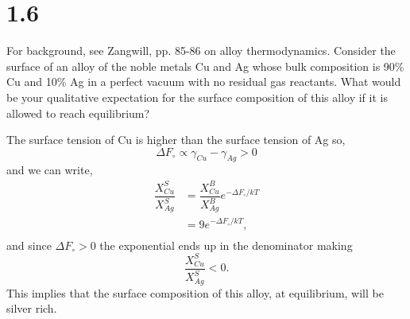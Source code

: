 \documentclass[12pt]{article}
\renewcommand{\=}[1]{\stackrel{#1}{=}} %
\theoremstyle{definition}
\theoremstyle{remark}
\begin{document}
\newpage
\section*{1.6}
\begin{bclogo}[logo=\bcquestion , barre=none]
\newline
For background, see Zangwill, pp. 85-86 on alloy thermodynamics.
\newline
Consider the surface of an alloy of the noble metals Cu and Ag whose bulk composition is 90\% Cu and 10\% Ag in a perfect vacuum with no residual gas reactants. What would be your qualitative expectation for the surface composition of this alloy if it is allowed to reach equilibrium? 
\end{bclogo}
\vspace{2cm}

The surface tension of Cu is higher than the surface tension of Ag so,
\[
\Delta F_{\circ} \propto \gamma_{Cu} - \gamma_{Ag} > 0
\]
and we can write,
\begin{align*}
\dfrac{X_{Cu}^S}{X_{Ag}^S} &= \dfrac{X_{Cu}^B}{X_{Ag}^B}e^{-\Delta F_{\circ}/kT}\\[3mm]
	&= 9e^{-\Delta F_{\circ}/kT},\\[3mm]
\end{align*}
and since $\Delta F_{\circ} > 0$ the exponential ends up in the denominator making 
\[
\dfrac{X_{Cu}^S}{X_{Ag}^S} < 0.
\]
This implies that the surface composition of this alloy, at equilibrium, will be silver rich.


\newpage
\end{document}
